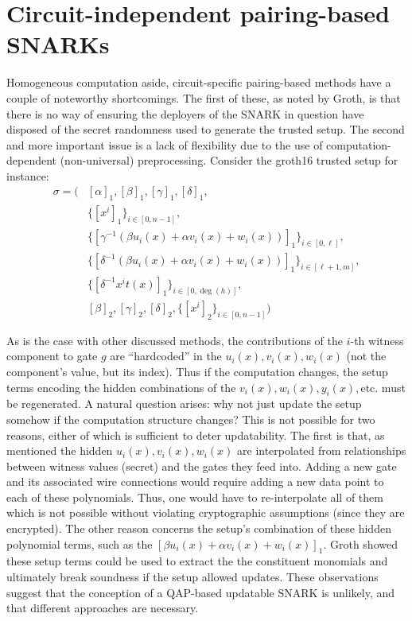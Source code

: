 \section{Circuit-independent pairing-based SNARKs}
\noindent Homogeneous computation aside, circuit-specific pairing-based methods have a couple of noteworthy shortcomings. The first of these, as noted by Groth, is that there is no way of ensuring the deployers of the SNARK in question have disposed of the secret randomness used to generate the trusted setup. The second and more important issue is a lack of flexibility due to the use of computation-dependent (non-universal) preprocessing. Consider the groth16 trusted setup for instance: 
\begin{align}
\sigma = \Big( 
    &[\alpha]_1, [\beta]_1, [\gamma]_1, [\delta]_1, \\
    &\{[x^i]_1\}_{i \in [0, n-1]}, \\
    &\{[\gamma^{-1}(\beta u_i(x) + \alpha v_i(x) + w_i(x))]_1\}_{i \in [0, \ell]}, \\
    &\{[\delta^{-1}(\beta u_i(x) + \alpha v_i(x) + w_i(x))]_1\}_{i \in [\ell+1, m]}, \\
    &\{[\delta^{-1} x^i t(x)]_1\}_{i \in [0, \deg(h)]}, \\
    &[\beta]_2, [\gamma]_2, [\delta]_2, \{[x^i]_2\}_{i \in [0, n-1]}
\Big)
\end{align}

\noindent As is the case with other discussed methods, the contributions of the $i$-th witness component to gate $g$ are ``hardcoded'' in the $u_i(x), v_i(x), w_i(x)$ (not the component's value, but its index). Thus if the computation changes, the setup terms encoding the hidden combinations of the $v_i(x), w_i(x), y_i(x), \text{etc.}$ must be regenerated. A natural question arises: why not just update the setup somehow if the computation structure changes? This is not possible for two reasons, either of which is sufficient to deter updatability. The first is that, as mentioned the hidden $u_i(x), v_i(x), w_i(x)$ are interpolated from relationships between witness values (secret) and the gates they feed into. Adding a new gate and its associated wire connections would require adding a new data point to each of these polynomials. Thus, one would have to re-interpolate all of them which is not possible without violating cryptographic assumptions (since they are encrypted). The other reason concerns the setup's combination of these hidden polynomial terms, such as the $[\beta u_i(x) + \alpha v_i(x) + w_i(x)]_1$. Groth showed these setup terms could be used to extract the the constituent monomials and ultimately break soundness if the setup allowed updates. These observations suggest that the conception of a QAP-based updatable SNARK is unlikely, and that different approaches are necessary.\\

